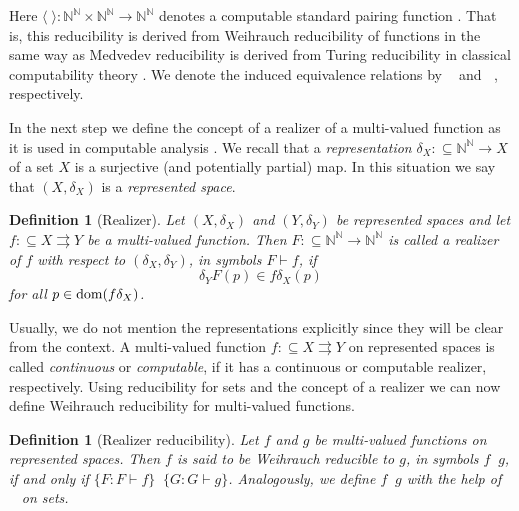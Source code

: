 \documentclass[jsl,10pt]{noasl}
\def\IN{{\mathbb{N}}}
\def\In{\subseteq}
\def\mto{\rightrightarrows}
\def\dom{{\rm dom}}
\def\leqW{\mathop{\leq_{\mathrm{W}}}}
\def\equivW{\mathop{\equiv_{\mathrm{W}}}}
\def\leqSW{\mathop{\leq_{\mathrm{sW}}}}
\def\equivSW{\mathop{\equiv_{\mathrm{sW}}}}
\newtheorem{definition}[proposition]{Definition}
\begin{document}
Here $\langle\;\rangle:\IN^\IN\times\IN^\IN\to\IN^\IN$ denotes
a computable standard pairing function \cite{Wei00}.
That is, this reducibility is derived from Weihrauch reducibility of functions
in the same way as Medvedev reducibility is derived from Turing reducibility
in classical computability theory \cite{Rog67}.
We denote the induced equivalence relations by $\equivW$ and $\equivSW$, respectively.

In the next step we define the concept of a realizer of a multi-valued function
as it is used in computable analysis \cite{Wei00}. We recall that a {\em representation}
$\delta_X:\In\IN^\IN\to X$ of a set $X$ is a surjective (and potentially partial) map.
In this situation we say that $(X,\delta_X)$ is a {\em represented space}.

\begin{definition}[Realizer]\rm
Let $(X,\delta_X)$ and $(Y,\delta_Y)$ be represented spaces
and let $f:\In X\mto Y$ be a multi-valued function.
Then $F:\In\IN^\IN\to\IN^\IN$ is called a {\em realizer} of $f$ with respect to
$(\delta_X,\delta_Y)$, in symbols $F\vdash f$, if 
\[\delta_YF(p)\in f\delta_X(p)\]
for all $p\in\dom(f\delta_X)$.
\end{definition}

Usually, we do not mention the representations explicitly 
since they will be clear from the context.
A multi-valued function $f:\In X\mto Y$ on represented spaces
is called {\em continuous} or {\em computable}, if it has a continuous
or computable realizer, respectively.
Using reducibility for sets and the concept of a realizer we can now
define Weihrauch reducibility for multi-valued functions.

\begin{definition}[Realizer reducibility]\rm
Let $f$ and $g$ be multi-valued functions on represented spaces. 
Then $f$ is said to be {\em Weihrauch reducible}
to $g$, in symbols $f\leqW g$, if and only if $\{F:F\vdash f\}\leqW\{G:G\vdash g\}$.
Analogously, we define $f\leqSW g$ with the help of $\leqSW$ on sets.
\end{definition}
\end{document}
